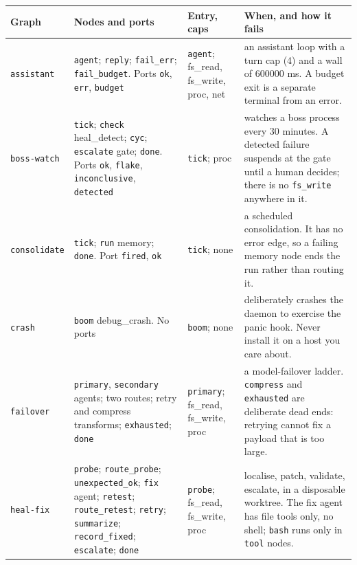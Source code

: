 {\footnotesize
\begin{longtable}{@{}>{\raggedright\arraybackslash}p{}>{\raggedright\arraybackslash}p{}>{\raggedright\arraybackslash}p{}>{\raggedright\arraybackslash}p{}@{}}
  \toprule
  \textbf{Graph} & \textbf{Nodes and ports} & \textbf{Entry, caps} & \textbf{When, and how it fails} \\
  \midrule
  \endhead
  \texttt{assistant} & \texttt{agent}; \texttt{reply}; \texttt{fail\_err};
    \texttt{fail\_budget}. Ports \texttt{ok}, \texttt{err}, \texttt{budget} & \texttt{agent};
    fs\_read, fs\_write, proc, net & an assistant loop with a turn cap (4) and a wall of
    600000 ms. A budget exit is a separate terminal from an error. \\
  \texttt{boss-watch} & \texttt{tick}; \texttt{check} heal\_detect; \texttt{cyc};
    \texttt{escalate} gate; \texttt{done}. Ports \texttt{ok}, \texttt{flake},
    \texttt{inconclusive}, \texttt{detected} & \texttt{tick}; proc & watches a boss process
    every 30 minutes. A detected failure suspends at the gate until a human decides; there is
    no \texttt{fs\_write} anywhere in it. \\
  \texttt{consolidate} & \texttt{tick}; \texttt{run} memory; \texttt{done}. Port
    \texttt{fired}, \texttt{ok} & \texttt{tick}; none & a scheduled consolidation. It has no
    error edge, so a failing memory node ends the run rather than routing it. \\
  \texttt{crash} & \texttt{boom} debug\_crash. No ports & \texttt{boom}; none & deliberately
    crashes the daemon to exercise the panic hook. Never install it on a host you care about. \\
  \texttt{failover} & \texttt{primary}, \texttt{secondary} agents; two routes; retry and
    compress transforms; \texttt{exhausted}; \texttt{done} & \texttt{primary}; fs\_read,
    fs\_write, proc & a model-failover ladder. \texttt{compress} and \texttt{exhausted} are
    deliberate dead ends: retrying cannot fix a payload that is too large. \\
  \texttt{heal-fix} & \texttt{probe}; \texttt{route\_probe}; \texttt{unexpected\_ok};
    \texttt{fix} agent; \texttt{retest}; \texttt{route\_retest}; \texttt{retry};
    \texttt{summarize}; \texttt{record\_fixed}; \texttt{escalate}; \texttt{done} &
    \texttt{probe}; fs\_read, fs\_write, proc & localise, patch, validate, escalate, in a
    disposable worktree. The fix agent has file tools only, no shell; \texttt{bash} runs only
    in \texttt{tool} nodes. \\

\end{longtable}}
